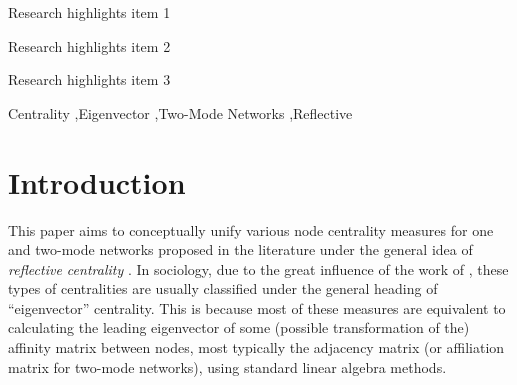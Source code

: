 \documentclass[a4paper,fleqn]{cas-sc}
\begin{document}
\begin{abstract}
This template helps you to create a properly formatted \LaTeX\ manuscript.

\noindent\texttt{\textbackslash begin{abstract}} \dots 
\texttt{\textbackslash end{abstract}} and
\verb+\begin{keyword}+ \verb+...+ \verb+\end{keyword}+ 
which
contain the abstract and keywords respectively. 

\noindent Each keyword shall be separated by a \verb+\sep+ command.
\end{abstract}


\begin{highlights}
\item Research highlights item 1
\item Research highlights item 2
\item Research highlights item 3
\end{highlights}

\begin{keywords}
Centrality \sep Eigenvector \sep Two-Mode Networks \sep Reflective
\end{keywords}


\maketitle

\section{Introduction}
This paper aims to conceptually unify various node centrality measures for one and two-mode networks proposed in the literature under the general idea of \textit{reflective centrality} \citep{hidalgo_hausmann09}. In sociology, due to the great influence of the work of \citet{bonacich72, bonacich87, bonacich91, bonacich_lloyd01}, these types of centralities are usually classified under the general heading of ``eigenvector'' centrality. This is because most of these measures are equivalent to calculating the leading eigenvector of some (possible transformation of the) affinity matrix between nodes, most typically the adjacency matrix (or affiliation matrix for two-mode networks), using standard linear algebra methods. 
\end{document}
